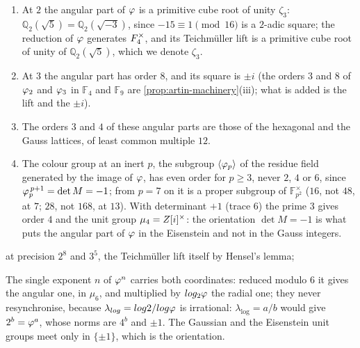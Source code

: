 \begin{proposition}\label{prop:polar}
\begin{enumerate}[label=\textup{(\roman*)}]
  \item At $2$ the angular part of $\varphi$ is a primitive cube root of unity $\zeta_3$:
        $\mathbb{Q}_2(\sqrt5)=\mathbb{Q}_2(\sqrt{-3})$, since $-15\equiv1\pmod{16}$ is a $2$-adic square; the
    reduction of $\varphi$ generates $F_4^\times$, and its Teichm\"uller lift is a primitive cube root of
    unity of $\mathbb{Q}_2(\sqrt5)$, which we denote $\zeta_3$.
  \item At $3$ the angular part has order $8$, and its square is $\pm i$ (the orders $3$ and $8$ of $\varphi_2$ and $\varphi_3$ in
    $\mathbb{F}_4$ and $\mathbb{F}_9$ are \cref{prop:artin-machinery}(iii); what is added is the lift and the $\pm i$).
  \item The orders $3$ and $4$ of these angular parts are those of the hexagonal and the Gauss
    lattices, of least common multiple $12$.
    \item The colour group at an inert $p$, the subgroup $\langle\varphi_p\rangle$ of the residue field generated by the
    image of $\varphi$, has even order for $p\geq3$, never $2$, $4$ or
    $6$, since $\varphi_p^{\,p+1}=\det M=-1$; from $p=7$ on it is a proper subgroup of
    $\mathbb{F}_{p^2}^\times$ ($16$, not $48$, at $7$; $28$, not $168$, at $13$).  With determinant $+1$ (trace
    $6$) the prime $3$ gives order $4$ and the unit group $\mu_4=Z[i]^\times$: the orientation
    $\det M=-1$ is what puts the angular part of $\varphi$ in the Eisenstein and not in the
    Gauss integers.
\end{enumerate}
\end{proposition}
at precision $2^8$ and $3^5$, the Teichm\"uller lift itself by Hensel's lemma;


The single exponent $n$ of $\varphi^n$ carries both coordinates: reduced modulo $6$ it gives the
angular one, in $\mu_6$, and multiplied by $log_2\varphi$ the radial one; they never resynchronise,
because $\lambda_{log}=log2/log\varphi$ is irrational: $\lambda_{\log}=a/b$ would give $2^b=\varphi^a$, whose norms are $4^b$ and $\pm1$.  The Gaussian and the Eisenstein unit groups meet
only in $\{\pm1\}$, which is the orientation.

